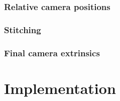 \documentclass{scrreprt}
\begin{document}
\subsection{Relative camera positions}

\subsection{Stitching}

\subsection{Final camera extrinsics}

\chapter{Implementation}

 
\end{document}

